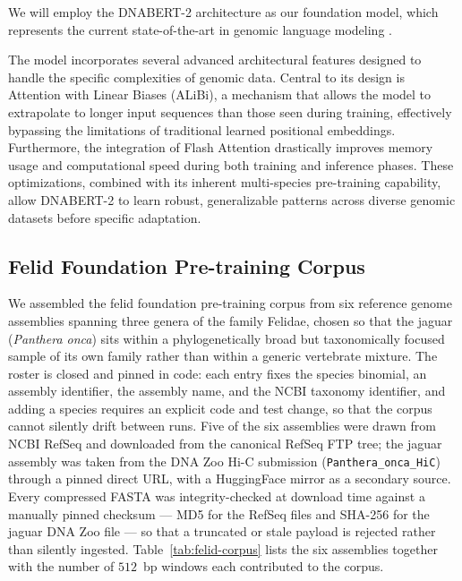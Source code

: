 \documentclass[twocolumn,10pt]{article}
\begin{document}
We will employ the DNABERT-2 architecture as our foundation model, which represents the current
state-of-the-art in genomic language modeling \citep{zhou2024dnabert}.

The model incorporates several advanced architectural features designed to handle the specific
complexities of genomic data. Central to its design is Attention with Linear Biases (ALiBi), a
mechanism that allows the model to extrapolate to longer input sequences than those seen during
training, effectively bypassing the limitations of traditional learned positional embeddings.
Furthermore, the integration of Flash Attention drastically improves memory usage and computational
speed during both training and inference phases. These optimizations, combined with its inherent
multi-species pre-training capability, allow DNABERT-2 to learn robust, generalizable patterns
across diverse genomic datasets before specific adaptation.

\subsection{Felid Foundation Pre-training Corpus}
We assembled the felid foundation pre-training corpus from six reference genome assemblies spanning
three genera of the family Felidae, chosen so that the jaguar (\textit{Panthera onca}) sits within a
phylogenetically broad but taxonomically focused sample of its own family rather than within a
generic vertebrate mixture. The roster is closed and pinned in code: each entry fixes the species
binomial, an assembly identifier, the assembly name, and the NCBI taxonomy identifier, and adding a
species requires an explicit code and test change, so that the corpus cannot silently drift between
runs. Five of the six assemblies were drawn from NCBI RefSeq and downloaded from the canonical
RefSeq FTP tree; the jaguar assembly was taken from the DNA Zoo Hi-C submission
(\texttt{Panthera\_onca\_HiC}) through a pinned direct URL, with a HuggingFace mirror as a secondary
source. Every compressed FASTA was integrity-checked at download time against a manually pinned
checksum --- MD5 for the RefSeq files and SHA-256 for the jaguar DNA Zoo file --- so that a
truncated or stale payload is rejected rather than silently ingested. Table~\ref{tab:felid-corpus}
lists the six assemblies together with the number of $512$~bp windows each contributed to the
corpus.
\end{document}
